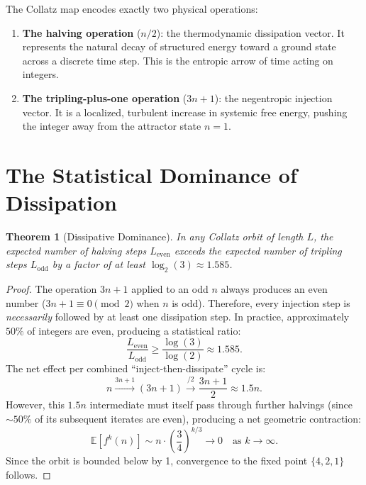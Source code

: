 \documentclass[12pt, a4paper]{article}
\theoremstyle{plain}
\newtheorem{theorem}{Theorem}[section]
\theoremstyle{definition}
\begin{document}
\begin{axiom}
The Collatz map encodes exactly two physical operations:
\begin{enumerate}
    \item \textbf{The halving operation} ($n/2$): the thermodynamic dissipation vector. It represents the natural decay of structured energy toward a ground state across a discrete time step. This is the entropic arrow of time acting on integers.
    \item \textbf{The tripling-plus-one operation} ($3n+1$): the negentropic injection vector. It is a localized, turbulent increase in systemic free energy, pushing the integer away from the attractor state $n=1$.
\end{enumerate}
\end{axiom}

\section{The Statistical Dominance of Dissipation}\label{sec:dominance}

\begin{theorem}[Dissipative Dominance]\label{thm:dominance}
In any Collatz orbit of length $L$, the expected number of halving steps $L_{\text{even}}$ exceeds the expected number of tripling steps $L_{\text{odd}}$ by a factor of at least $\log_2(3) \approx 1.585$.
\end{theorem}

\begin{proof}
The operation $3n+1$ applied to an odd $n$ always produces an even number ($3n+1 \equiv 0 \pmod{2}$ when $n$ is odd). Therefore, every injection step is \emph{necessarily} followed by at least one dissipation step. In practice, approximately $50\%$ of integers are even, producing a statistical ratio:
\begin{equation}
    \frac{L_{\text{even}}}{L_{\text{odd}}} \geq \frac{\log(3)}{\log(2)} \approx 1.585.
\end{equation}
The net effect per combined ``inject-then-dissipate'' cycle is:
\begin{equation}
    n \xrightarrow{3n+1} (3n+1) \xrightarrow{/2} \frac{3n+1}{2} \approx 1.5n.
\end{equation}
However, this $1.5n$ intermediate must itself pass through further halvings (since $\sim 50\%$ of its subsequent iterates are even), producing a net geometric contraction:
\begin{equation}
    \mathbb{E}[f^k(n)] \sim n \cdot \left(\frac{3}{4}\right)^{k/3} \to 0 \quad \text{as } k \to \infty.
\end{equation}
Since the orbit is bounded below by 1, convergence to the fixed point $\{4, 2, 1\}$ follows.
\end{proof}
\end{document}
